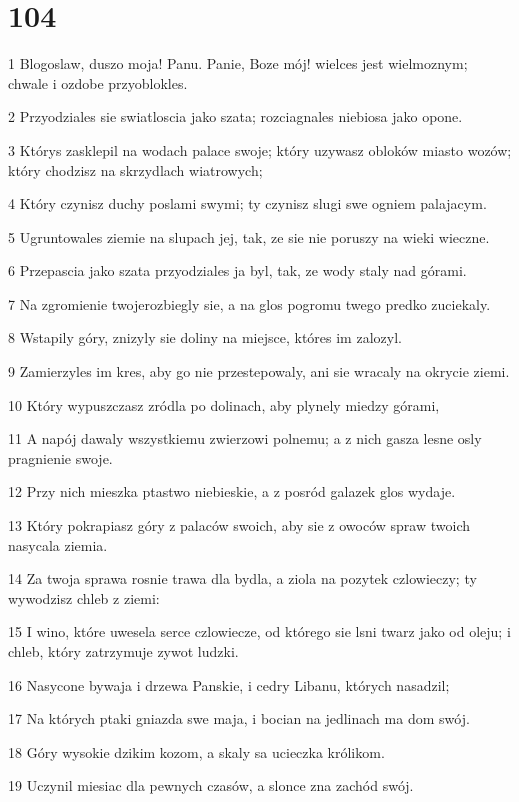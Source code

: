 \chapter{104}

\par 1 Blogoslaw, duszo moja! Panu. Panie, Boze mój! wielces jest wielmoznym; chwale i ozdobe przyoblokles.
\par 2 Przyodziales sie swiatloscia jako szata; rozciagnales niebiosa jako opone.
\par 3 Którys zasklepil na wodach palace swoje; który uzywasz obloków miasto wozów; który chodzisz na skrzydlach wiatrowych;
\par 4 Który czynisz duchy poslami swymi; ty czynisz slugi swe ogniem palajacym.
\par 5 Ugruntowales ziemie na slupach jej, tak, ze sie nie poruszy na wieki wieczne.
\par 6 Przepascia jako szata przyodziales ja byl, tak, ze wody staly nad górami.
\par 7 Na zgromienie twojerozbiegly sie, a na glos pogromu twego predko zuciekaly.
\par 8 Wstapily góry, znizyly sie doliny na miejsce, któres im zalozyl.
\par 9 Zamierzyles im kres, aby go nie przestepowaly, ani sie wracaly na okrycie ziemi.
\par 10 Który wypuszczasz zródla po dolinach, aby plynely miedzy górami,
\par 11 A napój dawaly wszystkiemu zwierzowi polnemu; a z nich gasza lesne osly pragnienie swoje.
\par 12 Przy nich mieszka ptastwo niebieskie, a z posród galazek glos wydaje.
\par 13 Który pokrapiasz góry z palaców swoich, aby sie z owoców spraw twoich nasycala ziemia.
\par 14 Za twoja sprawa rosnie trawa dla bydla, a ziola na pozytek czlowieczy; ty wywodzisz chleb z ziemi:
\par 15 I wino, które uwesela serce czlowiecze, od którego sie lsni twarz jako od oleju; i chleb, który zatrzymuje zywot ludzki.
\par 16 Nasycone bywaja i drzewa Panskie, i cedry Libanu, których nasadzil;
\par 17 Na których ptaki gniazda swe maja, i bocian na jedlinach ma dom swój.
\par 18 Góry wysokie dzikim kozom, a skaly sa ucieczka królikom.
\par 19 Uczynil miesiac dla pewnych czasów, a slonce zna zachód swój.
